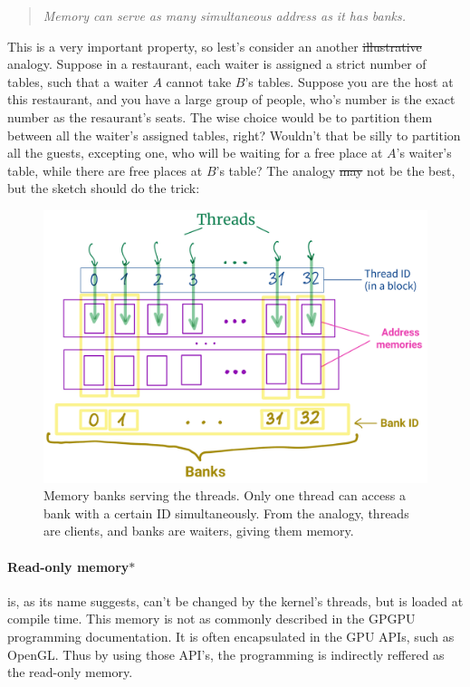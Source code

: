 \documentclass[12pt]{article}
\begin{document}
\begin{quote}
   \textsl{Memory can serve as many simultaneous address as it has banks.} 
\end{quote}
This is a very important property, so lest's consider an another \sout{illustrative} analogy. Suppose in a restaurant, each waiter 
is assigned a strict number of tables, such that a waiter $A$ cannot take $B$'s tables. Suppose you are the host at this restaurant, 
and you have a large group of people, who's number is the exact number as the resaurant's seats. The wise choice would be to 
partition them between all the waiter's assigned tables, right? Wouldn't that be silly to partition all the guests, excepting one, 
who will be waiting for a free place at $A$'s waiter's table, while there are free places at $B$'s table? The analogy \sout{may} not be 
the best, but the sketch should do the trick: 

\begin{figure}[H]
   \centering
   \includegraphics[scale=0.18]{pngs/banks1.png}
   \caption{Memory banks serving the threads. Only one thread can access a bank with a certain ID simultaneously. 
   From the analogy, threads are clients, and banks are waiters, giving them memory.}
   \label{banks}

\end{figure}

\vspace{-0.5cm}
\paragraph{Read-only memory$\ast$} is, as its name suggests, can't be changed by the kernel's threads, but is loaded at compile time. This memory is not as commonly 
described in the GPGPU programming documentation. It is often 
encapsulated in the GPU APIs, such as OpenGL. Thus by using those API's, the programming is indirectly 
reffered as the read-only memory.
\end{document}
